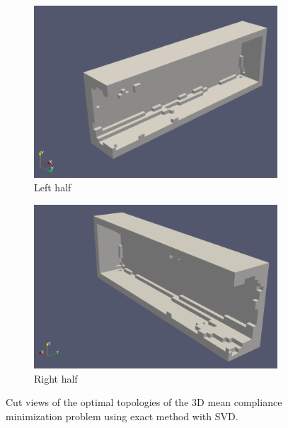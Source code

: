       \begin{figure}
        \begin{subfigure}[t]{0.45\textwidth}
          \centering
          \includegraphics[width=1\textwidth]{./images/robust_exact/exact_mean_1.png}
          \caption{Left half}
        \end{subfigure}
        \begin{subfigure}[t]{0.45\textwidth}
          \centering
          \includegraphics[width=1\textwidth]{./images/robust_exact/exact_mean_2.png}
          \caption{Right half}
        \end{subfigure}
        \caption{Cut views of the optimal topologies of the 3D mean compliance minimization problem using exact method with SVD.}
        \label{fig:exact_mean_3d}
      \end{figure}

